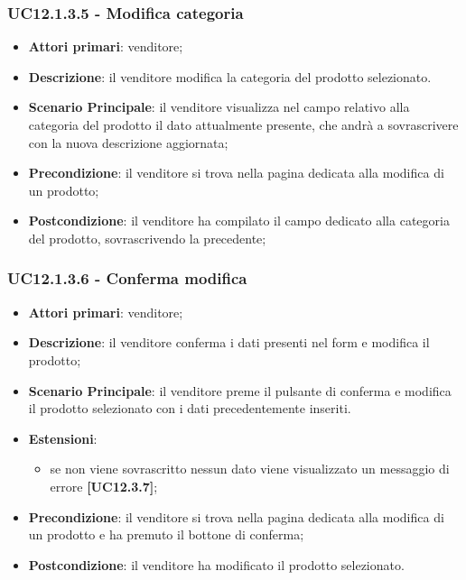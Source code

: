 \subsubsection{UC12.1.3.5 - Modifica categoria}
\begin{itemize}
\item \textbf{Attori primari}: venditore;
\item \textbf{Descrizione}: il venditore modifica la categoria del prodotto selezionato.
\item \textbf{Scenario Principale}: il venditore visualizza nel campo relativo alla categoria del prodotto il dato attualmente presente, che andrà a sovrascrivere con la nuova descrizione aggiornata;
\item \textbf{Precondizione}: il venditore si trova nella pagina dedicata alla modifica di un prodotto;
\item \textbf{Postcondizione}: il venditore ha compilato il campo dedicato alla categoria del prodotto, sovrascrivendo la precedente;
\end{itemize}

\subsubsection{UC12.1.3.6 - Conferma modifica}
\begin{itemize}
\item \textbf{Attori primari}: venditore;
\item \textbf{Descrizione}: il venditore conferma i dati presenti nel form e modifica il prodotto;
\item \textbf{Scenario Principale}: il venditore preme il pulsante di conferma e modifica il prodotto selezionato con i dati precedentemente inseriti.
\item \textbf{Estensioni}: 
\begin{itemize}
	\item se non viene sovrascritto nessun dato viene visualizzato un messaggio di errore \textbf{[UC12.3.7]};
\end{itemize} 
\item \textbf{Precondizione}: il venditore si trova nella pagina dedicata alla modifica di un prodotto e ha premuto il bottone di conferma;
\item \textbf{Postcondizione}: il venditore ha modificato il prodotto selezionato.
\end{itemize}

